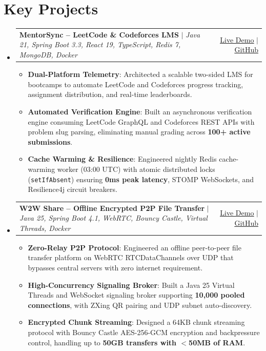 \documentclass[letterpaper,10pt]{article}
\makeatletter
\newcommand{\resumeItem}[2]{
  \item\small{
    \textbf{#1}{: #2 \vspace{-1.5pt}}
  }
}
\newcommand{\resumeProjectHeading}[2]{
  \vspace{-1.5pt}\item
    \begin{tabular*}{0.97\textwidth}[t]{l@{\extracolsep{\fill}}r}
      #1 & #2 \\
    \end{tabular*}\vspace{-5pt}
}
\newcommand{\resumeSubHeadingListStart}{\begin{itemize}[leftmargin=*,label={}]}
\newcommand{\resumeSubHeadingListEnd}{\end{itemize}}
\newcommand{\resumeItemListStart}{\begin{itemize}[leftmargin=12pt]}
\newcommand{\resumeItemListEnd}{\end{itemize}\vspace{-4pt}}
\makeatother
\begin{document}
\section{Key Projects}
    \resumeSubHeadingListStart
      \resumeProjectHeading
          {\textbf{MentorSync -- LeetCode \& Codeforces LMS} $|$ \emph{Java 21, Spring Boot 3.3, React 19, TypeScript, Redis 7, MongoDB, Docker}}{\href{https://mentorssync.vercel.app/}{\underline{Live Demo}} $|$ \href{https://github.com/varunkushwah31/Leetcode-Tracker-Frontend}{\underline{GitHub}}}
          \resumeItemListStart
            \resumeItem{Dual-Platform Telemetry}{Architected a scalable two-sided LMS for bootcamps to automate LeetCode and Codeforces progress tracking, assignment distribution, and real-time leaderboards.}
            \resumeItem{Automated Verification Engine}{Built an asynchronous verification engine consuming LeetCode GraphQL and Codeforces REST APIs with problem slug parsing, eliminating manual grading across \textbf{100+ active submissions}.}
            \resumeItem{Cache Warming \& Resilience}{Engineered nightly Redis cache-warming worker (03:00 UTC) with atomic distributed locks (\texttt{setIfAbsent}) ensuring \textbf{0ms peak latency}, STOMP WebSockets, and Resilience4j circuit breakers.}
          \resumeItemListEnd

      \resumeProjectHeading
          {\textbf{W2W Share -- Offline Encrypted P2P File Transfer} $|$ \emph{Java 25, Spring Boot 4.1, WebRTC, Bouncy Castle, Virtual Threads, Docker}}{\href{https://w2wshare.vercel.app/}{\underline{Live Demo}} $|$ \href{https://github.com/varunkushwah31/W2WShare}{\underline{GitHub}}}
          \resumeItemListStart
            \resumeItem{Zero-Relay P2P Protocol}{Engineered an offline peer-to-peer file transfer platform on WebRTC RTCDataChannels over UDP that bypasses central servers with zero internet requirement.}
            \resumeItem{High-Concurrency Signaling Broker}{Built a Java 25 Virtual Threads and WebSocket signaling broker supporting \textbf{10,000 pooled connections}, with ZXing QR pairing and UDP subnet auto-discovery.}
            \resumeItem{Encrypted Chunk Streaming}{Designed a 64KB chunk streaming protocol with Bouncy Castle AES-256-GCM encryption and backpressure control, handling up to \textbf{50GB transfers with $<$50MB of RAM}.}
          \resumeItemListEnd
    \resumeSubHeadingListEnd

\end{document}
